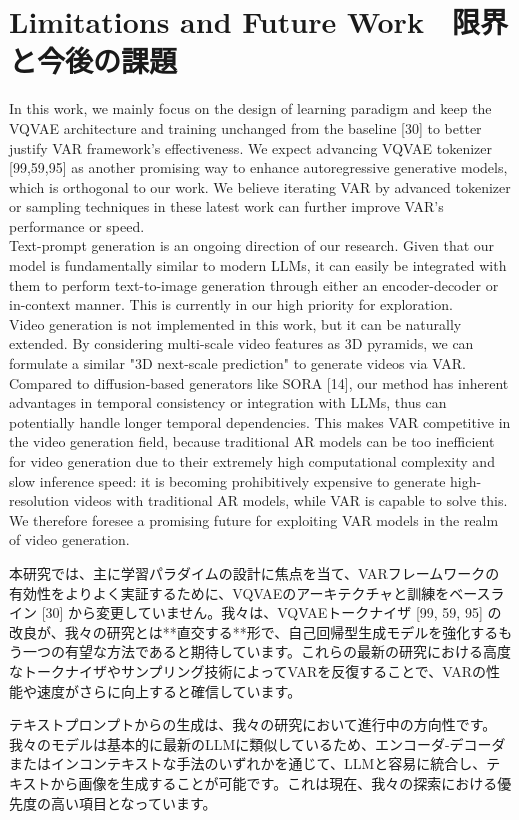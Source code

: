 \documentclass{article}
\begin{document}
\section{Limitations and Future Work　限界と今後の課題}
In this work, we mainly focus on the design of learning paradigm and keep the VQVAE architecture and training unchanged from the baseline [30] to better justify VAR framework's effectiveness. We expect advancing VQVAE tokenizer [99,59,95] as another promising way to enhance autoregressive generative models, which is orthogonal to our work. We believe iterating VAR by advanced tokenizer or sampling techniques in these latest work can further improve VAR's performance or speed.\\
Text-prompt generation is an ongoing direction of our research. Given that our model is fundamentally similar to modern LLMs, it can easily be integrated with them to perform text-to-image generation through either an encoder-decoder or in-context manner. This is currently in our high priority for exploration.\\[0pt]
Video generation is not implemented in this work, but it can be naturally extended. By considering multi-scale video features as 3D pyramids, we can formulate a similar "3D next-scale prediction" to generate videos via VAR. Compared to diffusion-based generators like SORA [14], our method has inherent advantages in temporal consistency or integration with LLMs, thus can potentially handle longer temporal dependencies. This makes VAR competitive in the video generation field, because traditional AR models can be too inefficient for video generation due to their extremely high computational complexity and slow inference speed: it is becoming prohibitively expensive to generate high-resolution videos with traditional AR models, while VAR is capable to solve this. We therefore foresee a promising future for exploiting VAR models in the realm of video generation.

本研究では、主に学習パラダイムの設計に焦点を当て、VARフレームワークの有効性をよりよく実証するために、VQVAEのアーキテクチャと訓練をベースライン [30] から変更していません。我々は、VQVAEトークナイザ [99, 59, 95] の改良が、我々の研究とは**直交する**形で、自己回帰型生成モデルを強化するもう一つの有望な方法であると期待しています。これらの最新の研究における高度なトークナイザやサンプリング技術によってVARを反復することで、VARの性能や速度がさらに向上すると確信しています。

テキストプロンプトからの生成は、我々の研究において進行中の方向性です。我々のモデルは基本的に最新のLLMに類似しているため、エンコーダ-デコーダまたはインコンテキストな手法のいずれかを通じて、LLMと容易に統合し、テキストから画像を生成することが可能です。これは現在、我々の探索における優先度の高い項目となっています。
\end{document}
